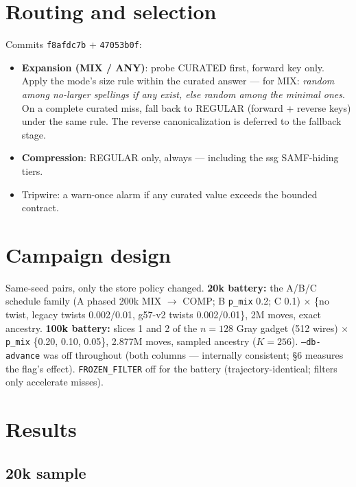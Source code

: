 \documentclass[11pt]{article}
\newcommand{\code}[1]{\texttt{#1}}
\begin{document}
\section{Routing and selection}

Commits \code{f8afdc7b} + \code{47053b0f}:

\begin{itemize}
\item \textbf{Expansion (MIX / ANY)}: probe CURATED first, forward key
only. Apply the mode's size rule within the curated answer --- for MIX:
\emph{random among no-larger spellings if any exist, else random among the
minimal ones}. On a complete curated miss, fall back to REGULAR (forward +
reverse keys) under the same rule. The reverse canonicalization is deferred
to the fallback stage.
\item \textbf{Compression}: REGULAR only, always --- including the ssg
SAMF-hiding tiers.
\item Tripwire: a warn-once alarm if any curated value exceeds the bounded
contract.
\end{itemize}

\section{Campaign design}

Same-seed pairs, only the store policy changed. \textbf{20k battery:} the
A/B/C schedule family (A phased 200k MIX $\to$ COMP; B \code{p\_mix} 0.2; C
0.1) $\times$ \{no twist, legacy twists 0.002/0.01, g57-v2 twists
0.002/0.01\}, 2M moves, exact ancestry. \textbf{100k battery:} slices 1
and 2 of the $n{=}128$ Gray gadget (512 wires) $\times$ \code{p\_mix}
\{0.20, 0.10, 0.05\}, 2.877M moves, sampled ancestry ($K{=}256$).
\code{--db-advance} was off throughout (both columns --- internally
consistent; \S6 measures the flag's effect). \code{FROZEN\_FILTER} off for
the battery (trajectory-identical; filters only accelerate misses).

\section{Results}

\subsection{20k sample}
\end{document}
